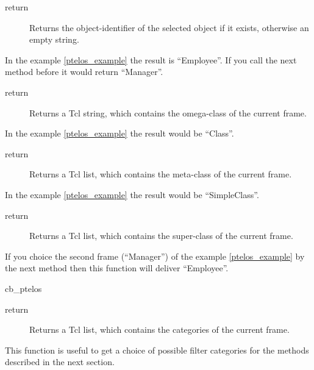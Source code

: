 	\begin{method}{ }
    	  \begin{description}	
	     \item[ return] 
		Returns the object-identifier of the selected object 
		 if it exists, otherwise an empty string.
	  \end{description}
	In the example \ref{ptelos_example} the result is ``Employee''.
	If you call the next method before it would return ``Manager''.
	\end{method}	
   \begin{method}{ }
    	  \begin{description}	
	     \item[ return] 
		Returns a Tcl string, which contains the omega-class 
		 of the current frame.
	  \end{description}
	In the example \ref{ptelos_example} the result would be ``Class''.
	\end{method}	
   \begin{method}{ }
    	  \begin{description}	
	     \item[ return] 
		Returns a Tcl list, which contains the meta-class
		 of the current frame.
	  \end{description}
	In the example \ref{ptelos_example} the result 
	 would be ``SimpleClass''.
	\end{method}	
   \begin{method}{ }
    	  \begin{description}	
	     \item[ return] 
		Returns a Tcl list, which contains the super-class 
		 of the current frame.
	  \end{description}
	If you choice the second frame (``Manager'') 
	 of the example \ref{ptelos_example} by the next method 
	 then this function will deliver ``Employee''.
	\end{method}	
   \begin{method}{{cb\_ptelos} }
    	  \begin{description}	
	     \item[ return] 
		Returns a Tcl list, which contains the categories
		 of the current frame.
	  \end{description}
	This function is useful to get a choice of possible filter categories
	 for the methods described in the next section.
	\end{method}	
